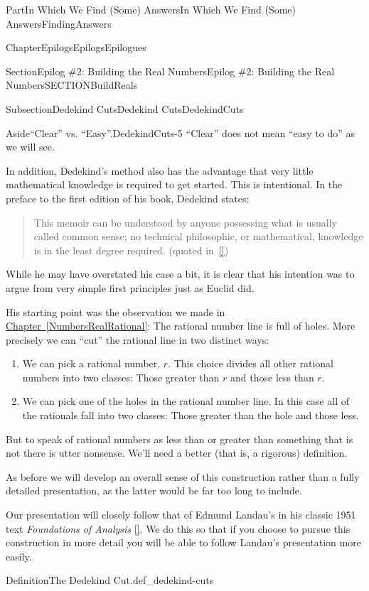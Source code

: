 \documentclass[oneside,10pt,]{book}
\newcommand{\xreffont}{\relax}
\newcommand{\pubtitle}[1]{\textsl{#1}}
\numberwithin{equation}{part}
\begin{document}
\begin{partptx}{Part}{In Which We Find (Some) Answers}{}{In Which We Find (Some) Answers}{}{}{FindingAnswers}
\begin{chapterptx}{Chapter}{Epilogs}{}{Epilogs}{}{}{Epilogues}
\begin{sectionptx}{Section}{Epilog \#2: Building the Real Numbers}{}{Epilog \#2: Building the Real Numbers}{}{}{SECTIONBuildReals}
\begin{subsectionptx}{Subsection}{Dedekind Cuts}{}{Dedekind Cuts}{}{}{DedekindCuts}
\begin{aside}{Aside}{``Clear'' vs. ``Easy''.}{DedekindCuts-5}%
``Clear'' does not mean ``easy to do'' as we will see.%
\end{aside}
 In addition, Dedekind's method also has the advantage that very little mathematical knowledge is required to get started.  This is intentional.  In the preface to the first edition of his book, Dedekind states:%
\begin{quote}%
This memoir can be understood by anyone possessing what is usually called common sense; no technical philosophic, or mathematical, knowledge is in the least degree required. (quoted in~\hyperlink{hawking05__god_creat_integ}{[{\xreffont 5}]})%
\end{quote}
While he may have overstated his case a bit, it is clear that his intention was to argue from very simple first principles just as Euclid did.%
\par
His starting point was the observation we made in \hyperref[NumbersRealRational]{Chapter~{\xreffont\ref{NumbersRealRational}}}: The rational number line is full of holes.  More precisely we can ``cut'' the rational line in two distinct ways:%
\begin{enumerate}
\item{}We can pick a rational number, \(r\).  This choice divides all other rational numbers into two classes: Those greater than \(r\) and those less than \(r\).%
\item{}We can pick one of the holes in the rational number line.  In this case all of the rationals fall into two classes: Those greater than the hole and those less.%
\end{enumerate}
%
\par
But to speak of rational numbers as less than or greater than something that is not there is utter nonsense. We'll need a better (that is, a rigorous) definition.%
\par
As before we will develop an overall sense of this construction rather than a fully detailed presentation, as the latter would be far too long to include.%
\par
Our presentation will closely follow that of Edmund Landau's in his classic 1951 text \pubtitle{Foundations of Analysis} \hyperlink{landau66__found_analy}{[{\xreffont 7}]}.  We do this so that if you choose to pursue this construction in more detail you will be able to follow Landau's presentation more easily.%
\begin{definition}{Definition}{The Dedekind Cut.}{def_dedekind-cuts}%

\end{definition}
\end{subsectionptx}
\end{sectionptx}
\end{chapterptx}
\end{partptx}
\end{document}
